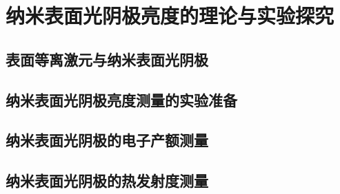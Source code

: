 \chapter{纳米表面光阴极亮度的理论与实验探究}
\label{chap:NPC}

\section{表面等离激元与纳米表面光阴极}

\section{纳米表面光阴极亮度测量的实验准备}

\section{纳米表面光阴极的电子产额测量}

\section{纳米表面光阴极的热发射度测量}
